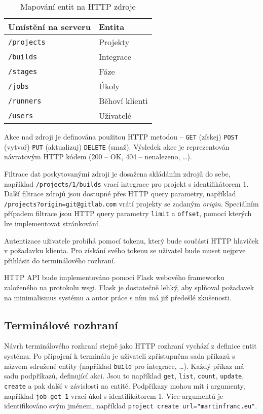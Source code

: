 \begin{table}[ht]
\centering
\caption{Mapování entit na HTTP zdroje}
\begin{tabular}{|l|l|}
\hline
Umístění na serveru & Entita \\ \hline
\verb|/projects| & Projekty \\ \hline
\verb|/builds| & Integrace \\ \hline
\verb|/stages| & Fáze \\ \hline
\verb|/jobs| & Úkoly \\ \hline
\verb|/runners| & Běhoví klienti \\ \hline
\verb|/users| & Uživatelé \\ \hline
\end{tabular}
\end{table}

Akce nad zdroji je definována použitou HTTP metodou -- \verb|GET| (získej) \verb|POST| (vytvoř) \verb|PUT| (aktualizuj) \verb|DELETE| (smaž).
Výsledek akce je reprezentován návratovým HTTP kódem (200 -- OK, 404 -- nenalezeno, \ldots).

Filtrace dat poskytovanými zdroji je dosažena skládáním zdrojů do sebe, například \verb|/projects/1/builds| vrací integrace pro projekt s identifikátorem 1.
Další filtrace zdrojů jsou dostupné přes HTTP query parametry, například \verb|/projects?origin=git@gitlab.com| vrátí projekty se zadaným \textit{origin}.
Speciálním případem filtrace jsou HTTP query parametry \verb|limit| a \verb|offset|, pomocí kterých lze implementovat stránkování.

Autentizace uživatele probíhá pomocí tokenu, který bude součástí HTTP hlaviček v požadavku klienta.
Pro získání svého tokenu se uživatel bude muset nejprve přihlásit do terminálového rozhraní.


HTTP API bude implementováno pomocí Flask webového frameworku založeného na protokolu wsgi.
Flask je dostatečně lehký, aby splňoval požadavek na minimalismus systému a autor práce s ním má již předešlé zkušenosti.

\subsection{Terminálové rozhraní}

Návrh terminálového rozhraní stejně jako HTTP rozhraní vychází z definice entit systému.
Po připojení k terminálu je uživateli zpřístupněna sada příkazů s názvem sdružené entity (například \verb|build| pro integrace, \ldots).
Každý příkaz má sadu podpříkazů, definující akci.
Jsou to například \verb|get|, \verb|list|, \verb|count|, \verb|update|, \verb|create| a pak další v závislosti na entitě.
Podpříkazy mohou mít i argumenty, například \verb|job get 1| vrací úkol s identifikátorem 1.
Více argumentů je identifikováno svým jménem, například \verb|project create url="martinfranc.eu"|.

